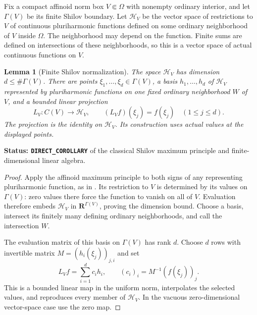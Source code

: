 \documentclass[11pt,a4paper]{article}
\numberwithin{equation}{section}
\newtheorem{lemma}[theorem]{Lemma}
\theoremstyle{definition}
\theoremstyle{remark}
\begin{document}
Fix a compact affinoid norm box $V\Subset\Omega$ with nonempty
ordinary interior, and let $\Gamma(V)$ be its finite Shilov boundary.
Let $\mathscr H_V$ be the vector space of restrictions to $V$ of
continuous pluriharmonic functions defined on some ordinary neighborhood
of $V$ inside $\Omega$. The neighborhood may depend on the function.
Finite sums are defined on intersections of these neighborhoods, so
this is a vector space of actual continuous functions on $V$.

\begin{lemma}[Finite Shilov normalization]
\label{lem:r6-finite-shilov-ph-normalization}
The space $\mathscr H_V$ has dimension $d\le\#\Gamma(V)$.
There are points $\xi_1,\ldots,\xi_d\in\Gamma(V)$, a basis
$h_1,\ldots,h_d$ of $\mathscr H_V$ represented by pluriharmonic
functions on one fixed ordinary neighborhood $W$ of $V$, and a
bounded linear projection
\[
        L_V:C(V)\longrightarrow\mathscr H_V,
       \qquad (L_Vf)(\xi_j)=f(\xi_j)\quad(1\le j\le d).
\]
The projection is the identity on $\mathscr H_V$. Its construction
uses actual values at the displayed points.
\end{lemma}

\noindent\textbf{Status: \texttt{DIRECT\_COROLLARY}} of the
classical Shilov maximum principle and finite-dimensional linear
algebra.

\begin{proof}
Apply the affinoid maximum principle to both signs of any representing
pluriharmonic function, as in \cite[Theorem 6.4]{GR25}. Its restriction
to $V$ is determined by its values on $\Gamma(V)$: zero values there
force the function to vanish on all of $V$. Evaluation therefore embeds
$\mathscr H_V$ in $\mathbf R^{\Gamma(V)}$, proving the dimension
bound. Choose a basis, intersect its finitely many defining ordinary
neighborhoods, and call the intersection $W$.

The evaluation matrix of this basis on $\Gamma(V)$ has rank $d$.
Choose $d$ rows with invertible matrix $M=(h_i(\xi_j))_{j,i}$ and set
\[
    L_Vf=\sum_{i=1}^d c_i h_i,
                   \qquad (c_i)_i=M^{-1}(f(\xi_j))_j.
\]
This is a bounded linear map in the uniform norm, interpolates the
selected values, and reproduces every member of $\mathscr H_V$.
In the vacuous zero-dimensional vector-space case use the zero map.
\end{proof}
\end{document}
